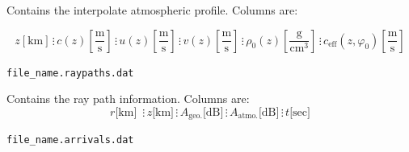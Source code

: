 \documentclass[10pt]{article}
\begin{document}
	Contains the interpolate atmospheric profile.  Columns are:
	\begin{small}
	\begin{equation*}
	 z \left[ \text{km} \right] \hspace{2pt} \vdots \hspace{2pt}
	 c (z) \left[\frac{\text{m}}{\text{s}} \right] \hspace{2pt} \vdots \hspace{2pt}
	 u(z) \left[ \frac{\text{m}}{\text{s}} \right] \hspace{2pt} \vdots \hspace{2pt}
	 v(z) \left[ \frac{\text{m}}{\text{s}} \right] \hspace{2pt} \vdots \hspace{2pt}
	 \rho_0(z) \left[ \frac{\text{g}}{\text{cm}^3} \right] \hspace{2pt} \vdots \hspace{2pt}
	 c_\text{eff} \left(z, \varphi_0 \right) \left[\frac{\text{m}}{\text{s}} \right] 
	\end{equation*}
	\end{small}

\newpage

	\verb=file_name.raypaths.dat= 
	
	Contains the ray path information.  Columns are:
	\begin{equation*}
	r \text{[km] } \hspace{2pt} \vdots \hspace{2pt} 
	z\text{[km]} \hspace{2pt} \vdots \hspace{2pt}
	A_\text{geo.} \text{[dB]} \hspace{2pt} \vdots \hspace{2pt}
	A_\text{atmo.} \text{[dB]} \hspace{2pt} \vdots \hspace{2pt}	
	t \text{[sec]}
	\end{equation*}

	\verb=file_name.arrivals.dat=
	
\end{document}
